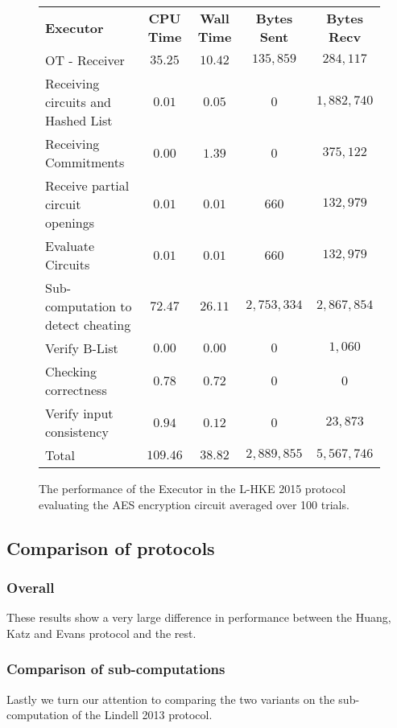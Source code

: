 \documentclass[ %
                    author={Nicholas Tutte},
                supervisor={Prof. Nigel Smart},
                    degree={MEng},
                     title={Secure Two Party Computation},
                  subtitle={A practical comparison of recent protocols},
                      type={Research - GG1K},
                      year={2015} ]{dissertation}
\begin{document}
				\begin{figure}[!ht]
					\begin{tabular}{| p{4.3cm} | c c c c |}
						\hline
						\textbf{Executor} & \textbf{CPU Time} & \textbf{Wall Time} & \textbf{Bytes Sent} & \textbf{Bytes Recv} \\
						\thickhline
						OT - Receiver & $35.25$ & $10.42$ & $135,859$ & $284,117$ \\
						\hline
						Receiving circuits and Hashed List & $0.01$ & $0.05$ & $0$ & $1,882,740$ \\
						\hline
						Receiving Commitments & $0.00$ & $1.39$ & $0$ & $375,122$ \\
						\hline
						Receive partial circuit openings & $0.01$ & $0.01$ & $660$ & $132,979$ \\
						\hline
						Evaluate Circuits & $0.01$ & $0.01$ & $660$ & $132,979$ \\
						\hline
						Sub-computation to detect cheating & $72.47$ & $26.11$ & $2,753,334$ & $2,867,854$ \\
						\hline
						Verify B-List & $0.00$ & $0.00$ & $0$ & $1,060$ \\
						\hline
						Checking correctness & $0.78$ & $0.72$ & $0$ & $0$ \\
						\hline
						Verify input consistency & $0.94$ & $0.12$ & $0$ & $23,873$ \\
						\thickhline
						Total & $109.46$ & $38.82$ & $2,889,855$ & $5,567,746$ \\
						\hline
					\end{tabular}
					\caption{The performance of the Executor in the L-HKE 2015 protocol evaluating the AES encryption circuit averaged over 100 trials. \label{table:L-HKE_2015_AES_Executor}}
				\end{figure}


			\subsection{Comparison of protocols}
				\subsubsection{Overall}

				These results show a very large difference in performance between the Huang, Katz and Evans protocol and the rest.

				\subsubsection{Comparison of sub-computations}
					Lastly we turn our attention to comparing the two variants on the sub-computation of the Lindell 2013 protocol. 
			
\end{document}
